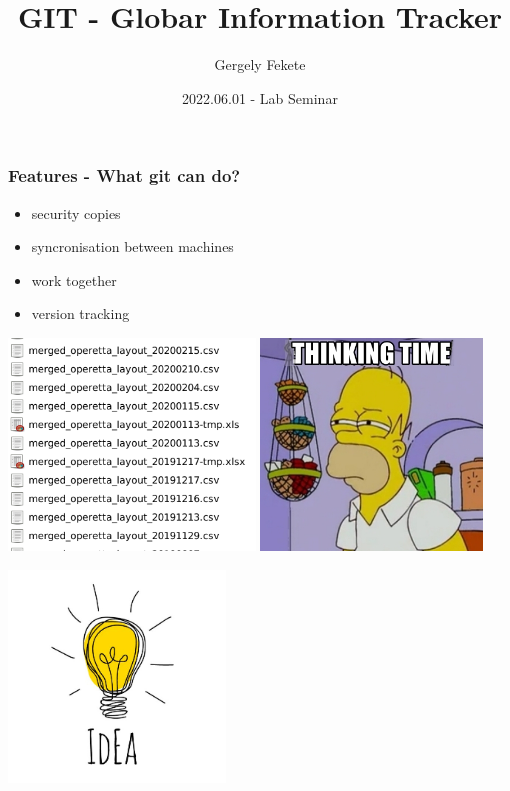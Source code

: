 \documentclass[aspectratio=169]{beamer}
\title{GIT - Globar Information Tracker}
\author{Gergely Fekete}
\date{2022.06.01 -  Lab Seminar}
\begin{document}
\begin{frame}
\titlepage
\end{frame}




\begin{frame}
	\frametitle<presentation>{Features - What git can do?}
	
	\begin{itemize}
	\item security copies
	\item syncronisation between machines
	\item work together
	\item version tracking
	\end{itemize}

\end{frame}

 
\begin{frame}
\includegraphics[height=160pt]{pictures/Screenshot_2020-02-25_17-47-03-ugly_folder-zoom_in.png}
\includegraphics[height=160pt]{pictures/Simson.png}
\end{frame}




\begin{frame}
\includegraphics[height=160pt]{pictures/idea.jpg}
\end{frame}
\end{document}
